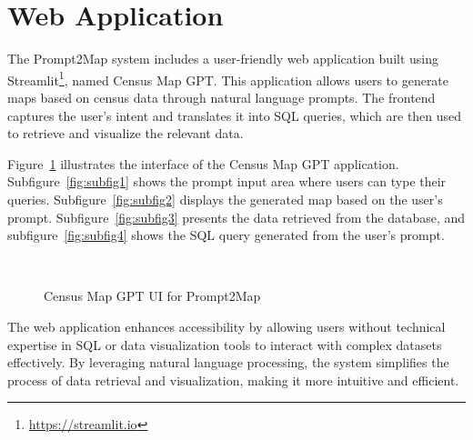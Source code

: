 \section{Web Application}

The Prompt2Map system includes a user-friendly web application built using Streamlit\footnote{\url{https://streamlit.io}}, named Census Map GPT. This application allows users to generate maps based on census data through natural language prompts. The frontend captures the user's intent and translates it into SQL queries, which are then used to retrieve and visualize the relevant data.

Figure~\ref{fig:prompt2map_ui} illustrates the interface of the Census Map GPT application. Subfigure~\ref{fig:subfig1} shows the prompt input area where users can type their queries. Subfigure~\ref{fig:subfig2} displays the generated map based on the user's prompt. Subfigure~\ref{fig:subfig3} presents the data retrieved from the database, and subfigure~\ref{fig:subfig4} shows the SQL query generated from the user's prompt.

\begin{figure}[htbp]
  \centering
  \\
  \caption{Census Map GPT UI for Prompt2Map}
  \label{fig:prompt2map_ui}
\end{figure}

The web application enhances accessibility by allowing users without technical expertise in SQL or data visualization tools to interact with complex datasets effectively. By leveraging natural language processing, the system simplifies the process of data retrieval and visualization, making it more intuitive and efficient.